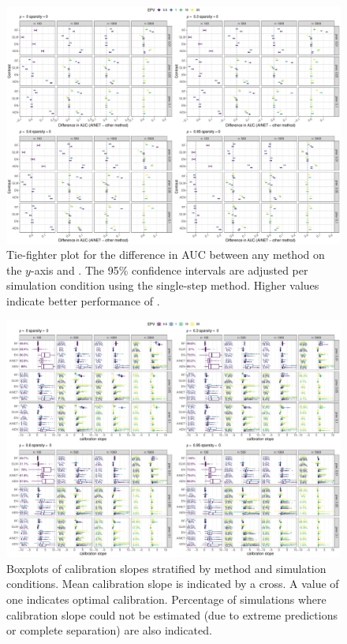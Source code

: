 \documentclass[a4paper, 11pt]{article}
\begin{document}
\begin{landscape}
\begin{figure}[!ht]
\center
\includegraphics[width=0.8\linewidth]{figureS4.pdf}
\caption{Tie-fighter plot for the difference in AUC between any method on
  the $y$-axis and \ainet{}. The 95\% confidence intervals are adjusted per
  simulation condition using the single-step method. Higher values indicate
  better performance of \ainet{}. } \label{fig:tieauc}
\end{figure}
\end{landscape}

\begin{landscape}
\begin{figure}[!ht]
\center
\includegraphics[width=0.8\linewidth]{figureS5.pdf}
\caption{Boxplots of calibration slopes stratified by method and simulation
  conditions. Mean calibration slope is indicated by a cross. A value of one
  indicates optimal calibration. Percentage of simulations where calibration
  slope could not be estimated (due to extreme predictions or complete
  separation) are also indicated.} \label{fig:cslope}
\end{figure}
\end{landscape}
\end{document}

